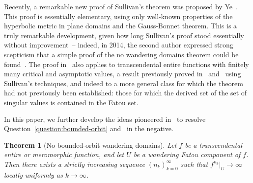 \documentclass[12pt,a4paper,reqno]{amsart}
\theoremstyle{plain}
\newtheorem{thm}{Theorem}[section]
\theoremstyle{definition}
\theoremstyle{remark}
\numberwithin{equation}{section}
\newcommand{\lr}[1]{{\color{magenta} #1}}
\begin{document}
 Recently, a remarkable new proof of Sullivan's theorem was proposed by Ye~\cite{ye26}. This proof
  is essentially elementary, using only well-known properties of the hyperbolic metric
  in plane domains and the Gauss-Bonnet theorem. This is a truly remarkable development,
  given how long Sullivan's proof stood essentially without improvement~-- indeed, in 2014,
  the second author expressed strong scepticism that a simple  proof of
  the no wandering domains theorem could be found~\cite{rempe-mathoverflow-2014}. The proof in~\cite{ye26} also applies to transcendental entire 
  functions with finitely many critical and asymptotic values,
  a result previously proved in~\cite{goldberg-keen86} and~\cite{eremenko-lyubich92}
  using Sullivan's techniques, and indeed to a more
  general class for which the theorem had not previously been
  established: those for which the derived set of the
  set of singular values is contained in the Fatou set. 

  In this paper, we further develop the ideas pioneered in~\cite{ye26} to resolve
  Question~\ref{question:bounded-orbit} \lr{and~\cite[Question~8]{bergweiler93}} in the negative. 
  
\begin{thm}[No bounded-orbit wandering domains]\label{thm:boundedorbitentire}
 Let $f$ be a transcendental entire \lr{or meromorphic} function, 
   and let $U$ be a wandering Fatou component 
   of $f$. Then there exists a strictly increasing sequence $(n_k)_{k=0}^{\infty}$ 
   such that $f^{n_k}|_U\to\infty$ locally uniformly as $k\to\infty$. 
\end{thm}
\end{document}
